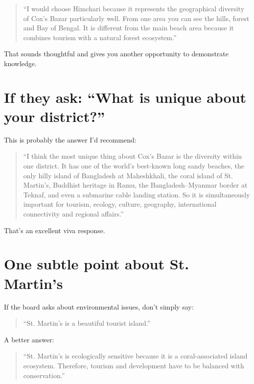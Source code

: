 \begin{quote}
``I would choose Himchari because it represents the geographical diversity of Cox's Bazar particularly well. From one area you can see the hills, forest and Bay of Bengal. It is different from the main beach area because it combines tourism with a natural forest ecosystem.''\\
\end{quote}

That sounds thoughtful and gives you another opportunity to demonstrate knowledge.

\medskip

\section{If they ask: ``What is unique about your district?''}

This is probably the answer I'd recommend:

\begin{quote}
``I think the most unique thing about Cox's Bazar is the diversity within one district. It has one of the world's best-known long sandy beaches, the only hilly island of Bangladesh at Maheshkhali, the coral island of St. Martin's, Buddhist heritage in Ramu, the Bangladesh--Myanmar border at Teknaf, and even a submarine cable landing station. So it is simultaneously important for tourism, ecology, culture, geography, international connectivity and regional affairs.''\\
\end{quote}

That's an excellent viva response.

\medskip

\section{One subtle point about St. Martin's}

If the board asks about environmental issues, don't simply say:

\begin{quote}
``St. Martin's is a beautiful tourist island.''\\
\end{quote}

A better answer:

\begin{quote}
``St. Martin's is ecologically sensitive because it is a coral-associated island ecosystem. Therefore, tourism and development have to be balanced with conservation.''\\
\end{quote}


